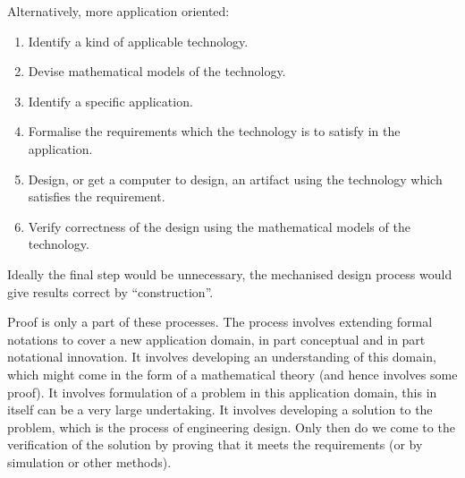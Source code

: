 Alternatively, more application oriented:

\begin{enumerate}
\item Identify a kind of applicable technology.
\item Devise mathematical models of the technology.
\item Identify a specific application.
\item Formalise the requirements which the technology is to satisfy in the application.
\item Design, or get a computer to design, an artifact using the technology which satisfies the requirement.
\item Verify correctness of the design using the mathematical models of the technology.
\end{enumerate}

Ideally the final step would be unnecessary, the mechanised design process would give results correct by ``construction''.

Proof is only a part of these processes.
The process involves extending formal notations to cover a new application domain, in part conceptual and in part notational innovation.
It involves developing an understanding of this domain, which might come in the form of a mathematical theory (and hence involves some proof).
It involves formulation of a problem in this application domain, this in itself can be a very large undertaking.
It involves developing a solution to the problem, which is the process of engineering design.
Only then do we come to the verification of the solution by proving that it meets the requirements (or by simulation or other methods).



